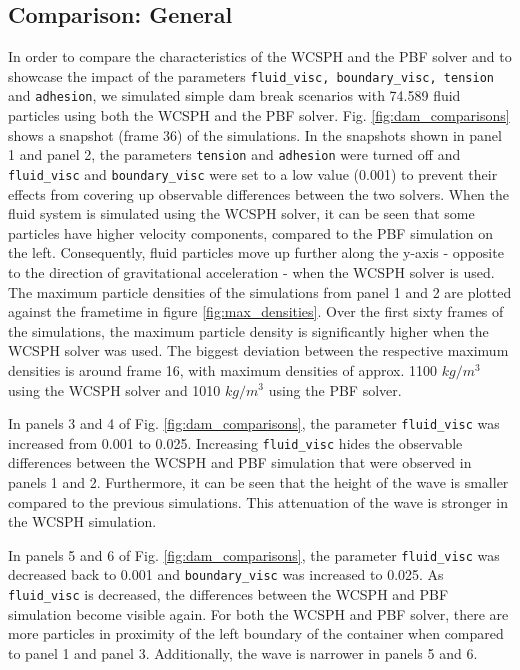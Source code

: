 \documentclass[11pt, letterpaper, twocolumn]{article}
\begin{document}
\subsection{Comparison: General}
\label{subsec:comparison_general}
In order to compare the characteristics of the WCSPH and the PBF solver and to showcase the impact of the parameters \texttt{fluid\_visc, boundary\_visc, tension} and \texttt{adhesion}, we simulated simple dam break scenarios with 74.589 fluid particles using both the WCSPH and the PBF solver.
Fig. \ref{fig:dam_comparisons} shows a snapshot (frame 36) of the simulations.
In the snapshots shown in panel 1 and panel 2, the parameters \texttt{tension} and \texttt{adhesion} were turned off and \texttt{fluid\_visc} and \texttt{boundary\_visc} were set to a low value (0.001) to prevent their effects from covering up observable differences between the two solvers.
When the fluid system is simulated using the WCSPH solver, it can be seen that
some particles have higher velocity components, compared to the PBF simulation on the left.
Consequently, fluid particles move up further along the y-axis - opposite to the direction of gravitational acceleration - when the WCSPH solver is used.
The maximum particle densities of the simulations from panel 1 and 2 are plotted against the frametime in figure \ref{fig:max_densities}.
Over the first sixty frames of the simulations, the maximum particle density is significantly higher when the WCSPH solver was used. The biggest deviation between the respective maximum densities is around frame 16, with maximum densities of approx. 1100 $kg / m^3$ using the WCSPH solver and 1010 $kg / m^3$ using the PBF solver. 

In panels 3 and 4 of Fig. \ref{fig:dam_comparisons}, the parameter \texttt{fluid\_visc} was increased from 0.001 to 0.025. Increasing \texttt{fluid\_visc} hides the observable differences between the WCSPH and PBF simulation that were observed in panels 1 and 2.
Furthermore, it can be seen that the height of the wave is smaller compared to the previous simulations. This attenuation of the wave is stronger in the WCSPH simulation.

In panels 5 and 6 of Fig. \ref{fig:dam_comparisons}, the parameter \texttt{fluid\_visc} was decreased back to 0.001 and \texttt{boundary\_visc} was increased to 0.025.
As \texttt{fluid\_visc} is decreased, the differences between the WCSPH and PBF simulation become visible again.
For both the WCSPH and PBF solver,  there are more particles in proximity of the left boundary of the container when compared to panel 1 and panel 3. Additionally, the wave is narrower in panels 5 and 6. 
\end{document}
